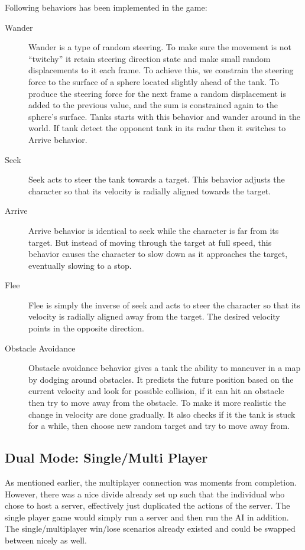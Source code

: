 \documentclass[letterpaper,11pt,twoside]{article}
\begin{document}
Following behaviors has been implemented in the game:
\begin{description}
	\item[Wander] Wander is a type of random steering. To make sure the movement is not ``twitchy'' it retain steering direction
state and make small random displacements to it each frame. To achieve this, we constrain the steering force to the surface of a sphere located slightly ahead of the tank. To produce the steering force for the next frame a random displacement is added to the previous value, and the sum is constrained again to the sphere's surface. Tanks starts with this behavior and wander around in the world. If tank detect the opponent tank in its radar then it switches to Arrive behavior.
	\item[Seek] Seek acts to steer the tank towards a target. This behavior adjusts the character so that its velocity is radially aligned towards the target.
	\item[Arrive] Arrive behavior is identical to seek while the character is far from its target. But instead of moving through the target at full speed, this behavior causes the character to slow down as it approaches the target, eventually slowing to a stop.
	\item[Flee] Flee is simply the inverse of seek and acts to steer the character so that its velocity is radially aligned away from the target. The desired velocity points in the opposite direction.
	\item[Obstacle Avoidance] Obstacle avoidance behavior gives a tank the ability to maneuver in a map by dodging around obstacles. It predicts the future position based on the current velocity and look for possible collision, if it can hit an obstacle then try to move away from the obstacle. To make it more realistic the change in velocity are done gradually. It also checks if it the tank is stuck for a while, then choose new random target and try to move away from.

\end{description}

\subsection{Dual Mode: Single/Multi Player}

As mentioned earlier, the multiplayer connection was moments from completion. However, there was a nice divide already set up such that the individual who chose to host a server, effectively just duplicated the actions of the server. The single player game would simply run a server and then run the AI in addition. The single/multiplayer win/lose scenarios already existed and could be swapped between nicely as well.
\end{document}
